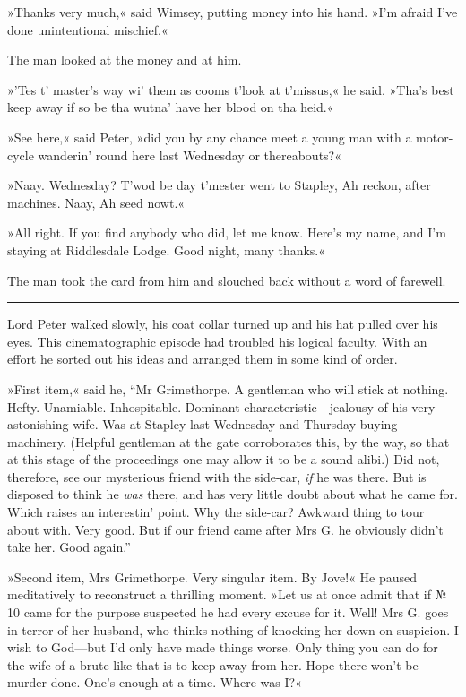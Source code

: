 »Thanks very much,« said Wimsey, putting money into his hand. »I'm afraid I've done unintentional mischief.«

The man looked at the money and at him.

»'Tes t' master's way wi' them as cooms t'look at t'missus,« he said.  »Tha's best keep away if so be tha wutna' have her blood on tha heid.«

»See here,« said Peter, »did you by any chance meet a young man with a motor-cycle wanderin' round here last Wednesday or thereabouts?«

»Naay. Wednesday? T'wod be day t'mester went to Stapley, Ah reckon, after machines. Naay, Ah seed nowt.«

»All right. If you find anybody who did, let me know. Here's my name, and I'm staying at Riddlesdale Lodge. Good night, many thanks.«

The man took the card from him and slouched back without a word of farewell.

\noindent\hfil\rule{0.5\textwidth}{.4pt}\hfil

Lord Peter walked slowly, his coat collar turned up and his hat pulled over his eyes. This cinematographic episode had troubled his logical faculty. With an effort he sorted out his ideas and arranged them in some kind of order.

»First item,« said he, \enquote{Mr Grimethorpe. A gentleman who will stick at nothing. Hefty. Unamiable. Inhospitable. Dominant characteristic—jealousy of his very astonishing wife. Was at Stapley last Wednesday and Thursday buying machinery. (Helpful gentleman at the gate corroborates this, by the way, so that at this stage of the proceedings one may allow it to be a sound alibi.) Did not, therefore, see our mysterious friend with the side-car, \textit{if} he was there. But is disposed to think he \textit{was} there, and has very little doubt about what he came for. Which raises an interestin' point. Why the side-car?  Awkward thing to tour about with. Very good. But if our friend came after Mrs G. he obviously didn't take her. Good again.}

»Second item, Mrs Grimethorpe. Very singular item. By Jove!« He paused meditatively to reconstruct a thrilling moment. »Let us at once admit that if № 10 came for the purpose suspected he had every excuse for it. Well! Mrs G. goes in terror of her husband, who thinks nothing of knocking her down on suspicion. I wish to God—but I'd only have made things worse. Only thing you can do for the wife of a brute like that is to keep away from her. Hope there won't be murder done. One's enough at a time. Where was I?«

